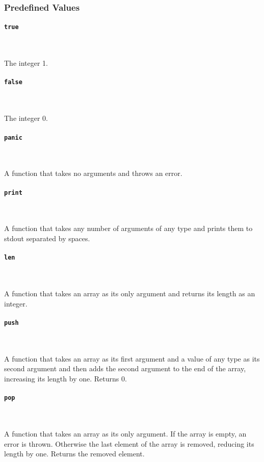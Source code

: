 \subsubsection{Predefined Values}

\paragraph{\texttt{true}} \

The integer 1.

\paragraph{\texttt{false}} \

The integer 0.

\paragraph{\texttt{panic}} \

A function that takes no arguments and throws an error.

\paragraph{\texttt{print}} \

A function that takes any number of arguments of any type and prints them to stdout separated by spaces.

\paragraph{\texttt{len}} \

A function that takes an array as its only argument and returns its length as an integer.

\paragraph{\texttt{push}} \

A function that takes an array as its first argument and a value of any type as its second argument and then adds the second argument to the end of the array, increasing its length by one. Returns 0.

\paragraph{\texttt{pop}} \

A function that takes an array as its only argument. If the array is empty, an error is thrown. Otherwise the last element of the array is removed, reducing its length by one. Returns the removed element.

